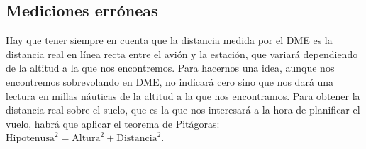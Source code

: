 \begin{figure}[!htb]
\hspace{3mm}
\end{figure}



\subsection{Mediciones err\'oneas}
\label{sec:DME.mediciones.erroneas}

Hay que tener siempre en cuenta que la distancia medida por el DME es la distancia real en l\'inea recta entre el avi\'on y la estaci\'on, que variar\'a dependiendo de la altitud a la que nos encontremos. Para hacernos una idea, aunque nos encontremos sobrevolando en DME, no indicar\'a cero sino que nos dar\'a una lectura en millas n\'auticas de la altitud a la que nos encontramos. Para obtener la distancia real sobre el suelo, que es la que nos interesar\'a a la hora de planificar el vuelo, habr\'a que aplicar el teorema de Pit\'agoras: $\text{Hipotenusa}^2 = \text{Altura}^2+\text{Distancia}^2$.


